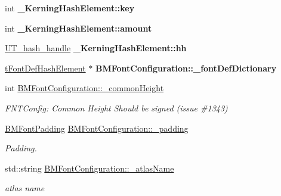 \begin{DoxyCompactItemize}
\item 
\mbox{\label{group__label_ga3d5a9cd723f885a8d24b75bb0289ce1d}} 
int {\bfseries \+\_\+\+Kerning\+Hash\+Element\+::key}
\item 
\mbox{\label{group__label_ga51a9c100050c2ab56431798e59509100}} 
int {\bfseries \+\_\+\+Kerning\+Hash\+Element\+::amount}
\item 
\mbox{\label{group__label_ga1438adce8be9c5fde6f185595d3af254}} 
\hyperlink{structUT__hash__handle}{U\+T\+\_\+hash\+\_\+handle} {\bfseries \+\_\+\+Kerning\+Hash\+Element\+::hh}
\item 
\mbox{\label{group__label_ga3681c646e0591e688177dbcd2c26f91a}} 
\hyperlink{struct__FontDefHashElement}{t\+Font\+Def\+Hash\+Element} $\ast$ {\bfseries B\+M\+Font\+Configuration\+::\+\_\+font\+Def\+Dictionary}
\item 
\mbox{\label{group__label_ga6409fa4f816ee11ee9f6d8ae836969aa}} 
int \hyperlink{group__label_ga6409fa4f816ee11ee9f6d8ae836969aa}{B\+M\+Font\+Configuration\+::\+\_\+common\+Height}
\begin{DoxyCompactList}\small\item\em F\+N\+T\+Config\+: Common Height Should be signed (issue \#1343) \end{DoxyCompactList}\item 
\mbox{\label{group__label_gac9bca22b336c401f9446dae89679e646}} 
\hyperlink{structBMFontPadding}{B\+M\+Font\+Padding} \hyperlink{group__label_gac9bca22b336c401f9446dae89679e646}{B\+M\+Font\+Configuration\+::\+\_\+padding}
\begin{DoxyCompactList}\small\item\em Padding. \end{DoxyCompactList}\item 
\mbox{\label{group__label_ga3ad769d94dce120f39c8f502bdbac2ad}} 
std\+::string \hyperlink{group__label_ga3ad769d94dce120f39c8f502bdbac2ad}{B\+M\+Font\+Configuration\+::\+\_\+atlas\+Name}
\begin{DoxyCompactList}\small\item\em atlas name \end{DoxyCompactList}\item 

\end{DoxyCompactItemize}
